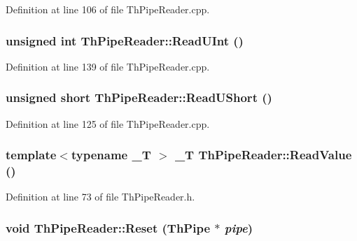 Definition at line 106 of file ThPipeReader.cpp.\hypertarget{class_th_pipe_reader_ca013702f2bf2a42d90d568d09fa10f9}{
\subsubsection[{ReadUInt}]{\setlength{\rightskip}{0pt plus 5cm}unsigned int ThPipeReader::ReadUInt ()}}
\label{class_th_pipe_reader_ca013702f2bf2a42d90d568d09fa10f9}




Definition at line 139 of file ThPipeReader.cpp.\hypertarget{class_th_pipe_reader_c632e10f9d824076c8716b7daf928dc8}{
\subsubsection[{ReadUShort}]{\setlength{\rightskip}{0pt plus 5cm}unsigned short ThPipeReader::ReadUShort ()}}
\label{class_th_pipe_reader_c632e10f9d824076c8716b7daf928dc8}




Definition at line 125 of file ThPipeReader.cpp.\hypertarget{class_th_pipe_reader_dcd18ecfa379c59db0101002a46db107}{
\subsubsection[{ReadValue}]{\setlength{\rightskip}{0pt plus 5cm}template$<$typename \_\-T $>$ \_\-T ThPipeReader::ReadValue ()}}
\label{class_th_pipe_reader_dcd18ecfa379c59db0101002a46db107}




Definition at line 73 of file ThPipeReader.h.\hypertarget{class_th_pipe_reader_b8e2c24b096dd07d26e40da1bdd8e129}{
\subsubsection[{Reset}]{\setlength{\rightskip}{0pt plus 5cm}void ThPipeReader::Reset ({\bf ThPipe} $\ast$ {\em pipe})}}
\label{class_th_pipe_reader_b8e2c24b096dd07d26e40da1bdd8e129}




